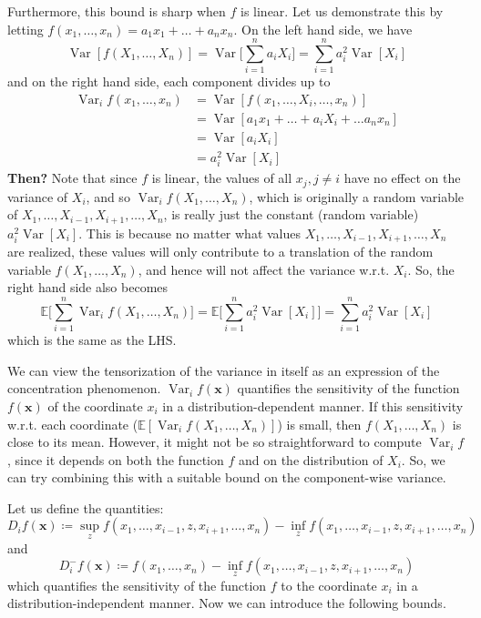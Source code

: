 \documentclass{article}
\DeclareMathOperator{\Var}{Var}
\begin{document}
  Furthermore, this bound is sharp when $f$ is linear. Let us demonstrate this by letting $f(x_1, \ldots, x_n) = a_1 x_1 + \ldots + a_n x_n$. On the left hand side, we have 
  \[\Var[ f(X_1, \ldots, X_n)] = \Var\bigg[ \sum_{i=1}^n a_i X_i \bigg] = \sum_{i=1}^n a_i^2 \Var[X_i] \]
  and on the right hand side, each component divides up to 
  \begin{align*}
      \Var_i f(x_1, \ldots, x_n ) & = \Var[ f(x_1, \ldots, X_i, \ldots, x_n)] \\
      & = \Var[ a_1 x_1 + \ldots + a_i X_i + \ldots a_n x_n] \\
      & = \Var[a_i X_i] \\
      & = a_i^2 \Var[X_i]
  \end{align*}
  \textbf{Then?} Note that since $f$ is linear, the values of all $x_j, j \neq i$ have no effect on the variance of $X_i$, and so $\Var_i f(X_1, \ldots, X_n)$, which is originally a random variable of $X_1, \ldots, X_{i-1}, X_{i+1}, \ldots, X_n$, is really just the constant (random variable) $a_i^2 \Var[X_i]$. This is because no matter what values $X_1, \ldots, X_{i-1}, X_{i+1}, \ldots, X_n$ are realized, these values will only contribute to a translation of the random variable $f(X_1, \ldots, X_n)$, and hence will not affect the variance w.r.t. $X_i$. So, the right hand side also becomes 
  \[\mathbb{E} \bigg[ \sum_{i=1}^n \Var_i f(X_1, \ldots, X_n) \bigg] = \mathbb{E} \bigg[ \sum_{i=1}^n a_i^2 \Var[X_i] \bigg] = \sum_{i=1}^n a_i^2 \Var[X_i]\]
  which is the same as the LHS. 

  We can view the tensorization of the variance in itself as an expression of the concentration phenomenon. $\Var_i f (\mathbf{x})$ quantifies the sensitivity of the function $f(\mathbf{x})$ of the coordinate $x_i$ in a distribution-dependent manner. If this sensitivity w.r.t. each coordinate ($\mathbb{E}[ \Var_i f(X_1, \ldots, X_n)]$) is small, then $f(X_1, \ldots, X_n)$ is close to its mean. However, it might not be so straightforward to compute $\Var_i f$, since it depends on both the function $f$ and on the distribution of $X_i$. So, we can try combining this with a suitable bound on the component-wise variance. 

  Let us define the quantities: 
  \[D_i f (\mathbf{x}) \coloneqq \sup_z f(x_1, \ldots, x_{i-1}, z, x_{i+1}, \ldots, x_n) - \inf_z f(x_1, \ldots, x_{i-1}, z, x_{i+1}, \ldots, x_n)\]
  and 
  \[D_i^- f(\mathbf{x}) \coloneqq f(x_1, \ldots, x_n) - \inf_z f(x_1, \ldots, x_{i-1}, z, x_{i+1}, \ldots, x_n)\]
  which quantifies the sensitivity of the function $f$ to the coordinate $x_i$ in a distribution-independent manner. Now we can introduce the following bounds. 
\end{document}
